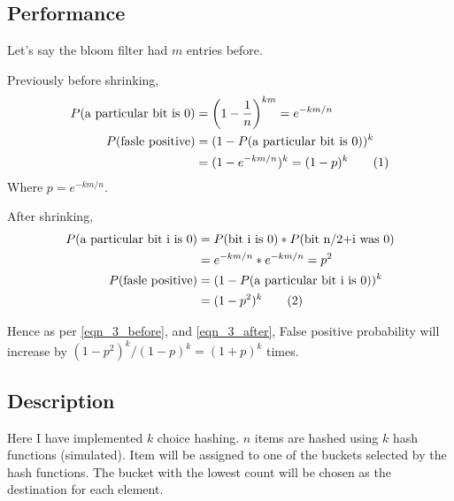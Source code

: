 \documentclass{homeworg}
\let\Oldsubsection\subsection
\renewcommand{\subsection}{\FloatBarrier\Oldsubsection}
\newcommand\numberthis{\addtocounter{equation}{1}\tag{\theequation}}
\begin{document}
\subsection{Performance}
Let's say the bloom filter had $m$ entries before. 

Previously before shrinking, 
\begin{align*}
    P(\text{a particular bit is 0}) &= \left(1-\frac{1}{n}\right)^{km} = e^{-km/n}\\
    P(\text{fasle positive}) &= (1-P(\text{a particular bit is 0}))^k\\
    &= (1-e^{-km/n})^k = (1-p)^k\numberthis\label{eqn_3_before}
\end{align*}
Where $p = e^{-km/n}$.

After shrinking, 
\begin{align*}
    P(\text{a particular bit i is 0}) &= P(\text{bit i is 0}) \ast P(\text{bit n/2+i was 0})  \\
    &= e^{-km/n} \ast e^{-km/n} = p^2\\
    P(\text{fasle positive}) &= (1-P(\text{a particular bit i is 0}))^k\\
    &= (1-p^2)^k\numberthis\label{eqn_3_after}
\end{align*}

Hence as per \ref{eqn_3_before}, and \ref{eqn_3_after},
False positive probability will increase by $(1-p^2)^k/ (1-p)^k = (1+p)^k$ times. 
\newpage
\exercise


\subsection{Description}
Here I have implemented $k$ choice hashing. $n$ items are hashed using $k$ hash functions (simulated). Item will be assigned to one of the buckets selected by the hash functions. The bucket with the lowest count will be chosen as the destination for each element.
\end{document}
